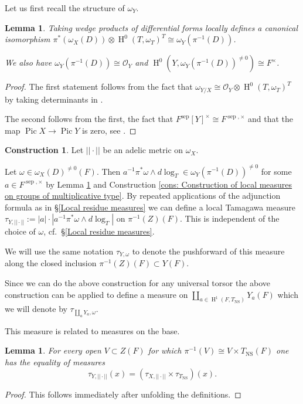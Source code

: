 \documentclass[a4paper,11pt,reqno]{amsart}
\DeclareMathOperator{\Pic}{Pic}
\DeclareMathOperator{\NS}{NS}
\DeclareMathOperator{\HH}{H}
\DeclareMathOperator{\sep}{sep}
\newtheorem{lemma}[theorem]{Lemma}
\theoremstyle{definition}
\newtheorem{construction}[theorem]{Construction}
\begin{document}
Let us first recall the structure of $\omega_{Y}$.
\begin{lemma}\label{lem:Properties of omega_Y}
	Taking wedge products of differential forms locally defines  a canonical isomorphism $\pi^{*}(\omega_X(D)) \otimes \HH^0(T, \omega_T)^T \cong \omega_Y(\pi^{-1}(D))$.
	
	We also have $\omega_Y(\pi^{-1}(D)) \cong \mathcal{O}_Y$ and $\HH^0(Y, \omega_Y(\pi^{-1}(D))^{\neq 0}) \cong F^{\times}$.
\end{lemma}
\begin{proof}
	The first statement follows from the fact that $\omega_{Y/X} \cong \mathcal{O}_Y \otimes \HH^0(T, \omega_T)^T$ by taking determinants in \cite[Prop.~3.8, 3.9]{Salberger1998Tamagawa}.
	
	The second follows from the first, the fact that $F^{\sep}[Y]^{\times} \cong F^{\sep, \times}$ and that the map $\Pic X \to \Pic Y$ is zero, see \cite[Prop. 2.1.1]{Colliot1987Descente}.
\end{proof}
\begin{construction}
	Let $||\cdot||$ be an adelic metric on $\omega_X$. 
	
	
	Let $\omega \in \omega_X(D)^{\neq 0}(F)$. Then $a^{-1} \pi^*\omega \wedge d\log_T \in \omega_Y(\pi^{-1}(D))^{\neq 0}$ for some $a \in F^{\sep, \times}$ by Lemma \ref{lem:Properties of omega_Y} and Construction \ref{cons: Construction of local measures on groups of multiplicative type}. By repeated applications of the adjunction formula as in \S\ref{Local residue measures} we can define a local Tamagawa measure $\tau_{Y, ||\cdot||} :=|a|\cdot |a^{-1} \pi^*\omega \wedge d\log_T|$ on $\pi^{-1}(Z)(F)$. This is independent of the choice of $\omega$, cf.~\S\ref{Local residue measures}.
	
	We will use the same notation $\tau_{Y, \omega}$ to denote the pushforward of this measure along the closed inclusion $\pi^{-1}(Z)(F) \subset Y(F)$.
	
	Since we can do the above construction for any universal torsor the above construction can be applied to define a measure on $\coprod_{a \in \HH^1(F, T_{\NS})} Y_a(F)$ which we will denote by $\tau_{\coprod_{a} Y_a, \omega}$.
\end{construction}

This measure is related to measures on the base.
\begin{lemma}\label{lem:measure on universal torsor is product of measure on base and measure on torus}
	For every open $V \subset Z(F)$ for which $\pi^{-1}(V) \cong V \times T_{\NS}(F)$ one has the equality of measures
	\[
	\tau_{Y, ||\cdot||}(x) = (\tau_{X, ||\cdot||} \times \tau_{T_{\NS}})(x).
	\]
\end{lemma}
\begin{proof}
	This follows immediately after unfolding the definitions.
\end{proof}
\end{document}
